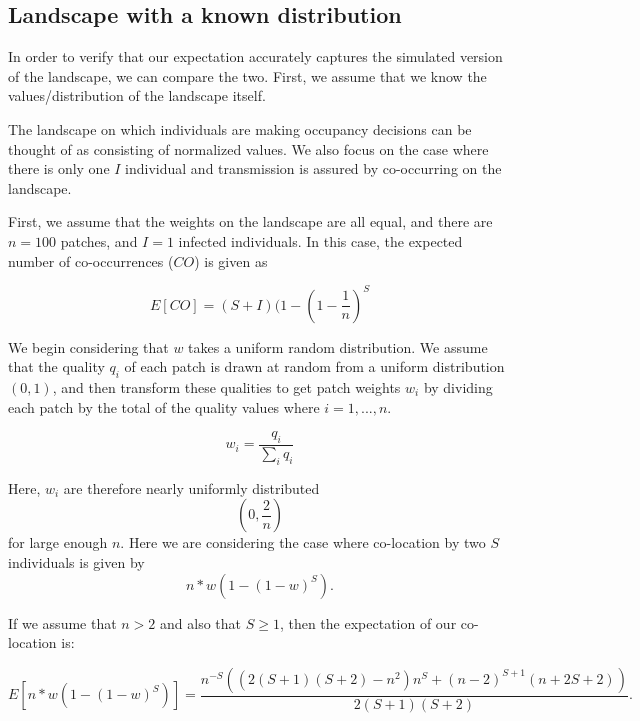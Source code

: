 \subsection{Landscape with a known distribution}

In order to verify that our expectation accurately captures the simulated version of the landscape, we can compare the two. First, we assume that we know the values/distribution of the landscape itself.

The landscape on which individuals are making occupancy decisions can be thought of as consisting of normalized values. We also focus on the case where there is only one $I$ individual and transmission is assured by co-occurring on the landscape.

First, we assume that the weights on the landscape are all equal, and there are $n=100$ patches, and $I=1$ infected individuals. In this case, the expected number of co-occurrences ($CO$) is given as 

\begin{equation}
    E[CO] = (S+I)(1-(1-\frac{1}{n})^S
\end{equation}


We begin considering that $w$ takes a uniform random distribution. We assume that the quality $q_i$ of each patch is drawn at random from a uniform distribution $(0,1)$, and then transform these qualities to get patch weights $w_i$ by dividing each patch by the total of the quality values where $i = 1,...,n$. 

\begin{equation}
    w_i = \frac{q_i}{\sum_i{q_i}}
\end{equation}

Here, $w_i$ are therefore nearly uniformly distributed 
\begin{equation}
    (0, \frac{2}{n})
\end{equation} 
for large enough $n$. Here we are considering the case where co-location by two $S$ individuals is given by 
\begin{equation}
    n*w(1-(1-w)^S).
\end{equation} 

If we assume that $n>2$ and also that $S \geq 1$, then the expectation of our co-location is: 

\begin{equation}
    E[n*w(1-(1-w)^S)] = \frac{n^{-S} \left(\left(2 (S+1) (S+2)-n^2\right) n^S+(n-2)^{S+1} (n+2
   S+2)\right)}{2 (S+1) (S+2)}. 
\end{equation}

